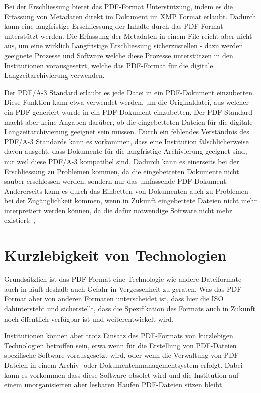 \documentclass[a4paper,oneside, 12pt]{report}
\begin{document}
 Bei der Erschliessung bietet das PDF-Format Unterstützung, indem es die Erfassung von Metadaten direkt im Dokument im \ac{XMP} Format erlaubt. Dadurch kann eine langfristige Erschliessung der Inhalte durch das PDF-Format unterstützt werden. Die Erfassung der Metadaten in einem File reicht aber nicht aus, um eine wirklich Langfristige Erschliessung sicherzustellen - dazu werden geeignete Prozesse und Software welche diese Prozesse unterstützen in den Institutionen vorausgesetzt, welche das PDF-Format für die digitale Langzeitarchivierung verwenden.

 Der PDF/A-3 Standard erlaubt es jede Datei in ein PDF-Dokument einzubetten. Diese Funktion kann etwa verwendet werden, um die Originaldatei, aus welcher ein PDF generiert wurde in ein PDF-Dokument einzubetten. Der PDF-Standard macht aber keine Angaben darüber, ob die eingebetteten Dateien für die digitale Langzeitarchivierung geeignet sein müssen. Durch ein fehlendes Verständnis des PDF/A-3 Standards kann es vorkommen, dass eine Institution fälschlicherweise davon ausgeht, dass Dokumente für die langfristige Archivierung geeignet sind, nur weil diese PDF/A-3 kompatibel sind. Dadurch kann es einerseits bei der Erschliessung zu Problemen kommen, da die eingebetteten Dokumente nicht sauber erschlossen werden, sondern nur das umfassende PDF-Dokument. Andererseits kann es durch das Einbetten von Dokumenten auch zu Problemen bei der Zugänglichkeit kommen, wenn in Zukunft eingebettete Dateien nicht mehr interpretiert werden können, da die dafür notwendige Software nicht mehr existiert. \cite{pdftools}, \cite{pdfanutshell}

\section{Kurzlebigkeit von Technologien}
Grundsätzlich ist das PDF-Format eine Technologie wie andere Dateiformate auch in läuft deshalb auch Gefahr in Vergessenheit zu geraten. Was das PDF-Format aber von anderen Formaten unterscheidet ist, dass hier die \ac{ISO} dahintersteht und sicherstellt, dass die Spezifikation des Formats auch in Zukunft noch öffentlich verfügbar ist und weiterentwickelt wird. 

Institutionen können aber trotz Einsatz des PDF-Formats von kurzlebigen Technologien betroffen sein, etwa wenn für die Erstellung von PDF-Dateien spezifische Software vorausgesetzt wird, oder wenn die Verwaltung von PDF-Dateien in einem Archiv- oder Dokumentenmanagementsystem erfolgt. Dabei kann es vorkommen dass diese Software obsolet wird und die Institution auf einem unorganisierten aber lesbaren Haufen PDF-Dateien sitzen bleibt.
\end{document}
